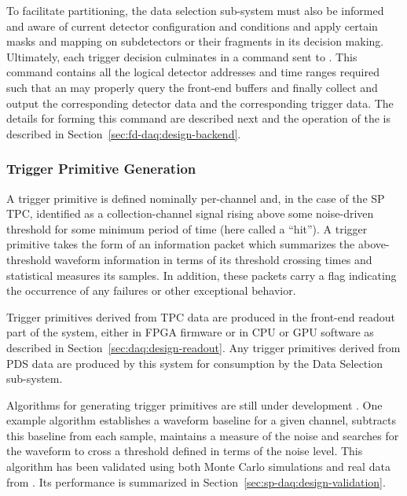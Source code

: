 To facilitate partitioning, the data selection sub-system must also be
informed and aware of current detector configuration and conditions and
apply certain masks and mapping on subdetectors or their fragments in
its decision making. 
Ultimately, each trigger decision culminates in a command sent to . 
This command contains all the logical detector addresses and time ranges
required such that an  may properly query the front-end
buffers and finally collect and output the corresponding detector data
and the corresponding trigger data.  The details for forming this
command are described next and the operation of the  is
described in Section~\ref{sec:fd-daq:design-backend}.

\subsubsection{Trigger Primitive Generation}
\label{sec:sp-daq:design-trigger-primitives}

A trigger primitive is defined nominally per-channel and, in the case of
the SP TPC, identified as a collection-channel signal rising above some
noise-driven threshold for some minimum period of time (here called a
``hit'').
A trigger primitive takes the form of an information packet which
summarizes the above-threshold waveform information in terms of its
threshold crossing times and statistical measures its samples. 
In addition, these packets carry a flag indicating the occurrence of any
failures or other exceptional behavior.

Trigger primitives derived from TPC data
are produced in the front-end readout part of the  system,
either in FPGA firmware or in CPU or GPU software as described in
Section~\ref{sec:daq:design-readout}.
Any trigger primitives derived from PDS data are produced by this system
for consumption by the  Data Selection sub-system.

Algorithms for generating trigger primitives are still under development
\cite{docid-11275}. 
One example algorithm\cite{docid-11236} establishes a waveform baseline
for a given channel, subtracts this baseline from each sample, maintains
a measure of the noise and searches for the waveform to cross a
threshold defined in terms of the noise level.
This algorithm has been validated using both Monte Carlo simulations and
real data from . 
Its performance is summarized in
Section~\ref{sec:sp-daq:design-validation}.

